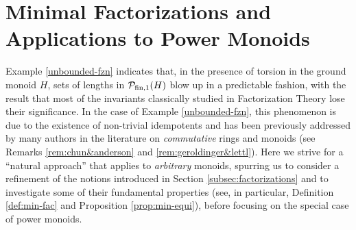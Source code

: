 \chapter{Minimal Factorizations and Applications to Power Monoids} \label{ch:minimal factorizations}

Example \ref{unbounded-fzn} indicates that, in the presence of torsion in the ground monoid $H$, sets of lengths in $\mathcal{P}_{\textrm{fin}, 1}(H)$ blow up in a predictable fashion, with the result that most of the invariants classically studied in Factorization Theory lose their significance. 
In the case of Example \ref{unbounded-fzn}, this phenomenon is due to the existence of non-trivial idempotents and has been previously addressed by many authors in the literature on \emph{commutative} rings and monoids (see Remarks \ref{rem:chun&anderson} and \ref{rem:geroldinger&lettl}).
Here we strive for a ``natural approach'' that applies to \emph{arbitrary} monoids, spurring us to consider a refinement of the notions introduced in Section \ref{subsec:factorizations} and to investigate some of their fundamental properties (see, in particular, Definition \ref{def:min-fac} and Proposition \ref{prop:min-equi}), before focusing on the special case of power monoids.

